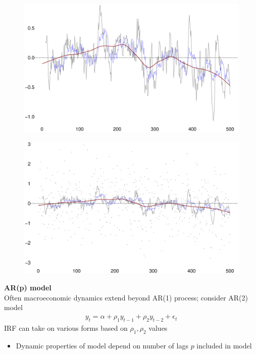 \documentclass{beamer}
\begin{document}
\begin{frame}
  \begin{figure}
    \includegraphics[scale=.3]{slutsky.eps}
  \end{figure}
\end{frame}

\begin{frame}
  \begin{figure}
    \includegraphics[scale=.3]{slutsky2.eps}
  \end{figure}
\end{frame}


\begin{frame}
  \textbf{AR(p) model}\\
  Often macroeconomic dynamics extend beyond AR(1) process; consider AR(2) model
  \begin{align}
  y_t = \alpha + \rho_1 y_{t-1} + \rho_2 y_{t-2} + \epsilon_t
  \end{align}
  \medskip
  IRF can take on various forms based on $\rho_1,\rho_2$ values
  \begin{itemize}    
    \item Dynamic properties of model depend on number of lags $p$ included in model
  \end{itemize}
\end{frame}
\end{document}

